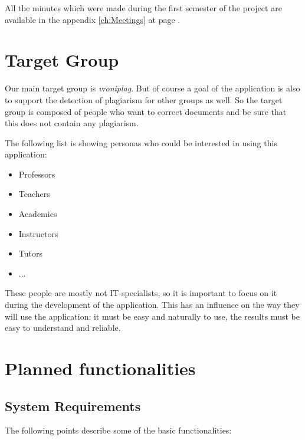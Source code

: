 All the minutes which were made during the first semester of the project are available in the appendix \ref{ch:Meetings} 
at page \pageref{ch:Meetings}.

\section{Target Group}

Our main target group is \textit{vroniplag}.
\minisec{}
But of course a goal of the application is also to support the detection of plagiarism for other groups as well. So the target group is composed of people who want to correct documents and be sure that this does not contain any plagiarism.

The following list is showing personas who could be interested in using this application:

\begin{itemize}
\item Professors 
\item Teachers
\item Academics
\item Instructors
\item Tutors
\item ...
\end{itemize}

These people are mostly not IT-specialists, so it is important to focus on it during the development of the application. This has an influence on the way they will use the application: it must be easy and naturally to use, the results must be easy to understand and reliable.

\section{Planned functionalities}
\subsection{System Requirements}

The following points describe some of the basic functionalities:

